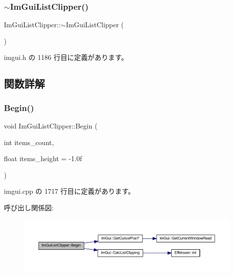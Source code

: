 \subsubsection{\texorpdfstring{$\sim$\+Im\+Gui\+List\+Clipper()}{~ImGuiListClipper()}}
{\footnotesize\ttfamily Im\+Gui\+List\+Clipper\+::$\sim$\+Im\+Gui\+List\+Clipper (\begin{DoxyParamCaption}{ }\end{DoxyParamCaption})\hspace{0.3cm}{\ttfamily [inline]}}



 imgui.\+h の 1186 行目に定義があります。



\subsection{関数詳解}
\mbox{\label{struct_im_gui_list_clipper_a746fbd724a41dbe88fef4875a2b1e9c7}} 
\subsubsection{\texorpdfstring{Begin()}{Begin()}}
{\footnotesize\ttfamily void Im\+Gui\+List\+Clipper\+::\+Begin (\begin{DoxyParamCaption}\item[{int}]{items\+\_\+count,  }\item[{float}]{items\+\_\+height = {\ttfamily -\/1.0f} }\end{DoxyParamCaption})}



 imgui.\+cpp の 1717 行目に定義があります。

呼び出し関係図\+:\nopagebreak
\begin{figure}[H]
\begin{center}
\leavevmode
\includegraphics[width=350pt]{struct_im_gui_list_clipper_a746fbd724a41dbe88fef4875a2b1e9c7_cgraph}
\end{center}
\end{figure}
\mbox{\label{struct_im_gui_list_clipper_a3e6aec0db317985319a78513fc2c8068}} 
